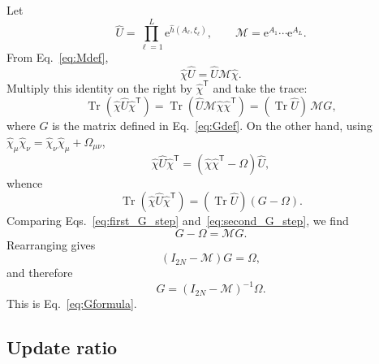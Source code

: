 \documentclass[twocolumn,aps,prb,10pt,amsmath,amssymb,amsthm,superscriptaddress]{revtex4-2}
\newcommand{\Tr}{\operatorname{Tr}}
\newcommand{\ee}{\mathrm{e}}
\newcommand{\trans}{\mathsf{T}}
\newcommand{\mc}[1]{\mathcal{#1}}
\theoremstyle{remark}
\begin{document}
Let
\begin{equation}
    \hat U = \prod_{\ell=1}^{L}\ee^{\hat h(A_\ell,\xi_\ell)},
    \qquad
    \mc M = \ee^{A_1}\cdots\ee^{A_L}.
\end{equation}
From Eq.~\eqref{eq:Mdef},
\begin{equation}
    \hat\chi\hat U = \hat U\mc M\hat\chi.
    \label{eq:chiUappendix}
\end{equation}
Multiply this identity on the right by $\hat\chi^\trans$ and take the trace:
\begin{equation}
    \Tr\left(\hat\chi\hat U\hat\chi^\trans\right)
    = \Tr\left(\hat U\mc M\hat\chi\hat\chi^\trans\right)
    = (\Tr\hat U)\,\mc M G,
    \label{eq:first_G_step}
\end{equation}
where $G$ is the matrix defined in Eq.~\eqref{eq:Gdef}. On the other hand, using $\hat\chi_\mu\hat\chi_\nu = \hat\chi_\nu\hat\chi_\mu + \Omega_{\mu\nu}$,
\begin{equation}
    \hat\chi\hat U\hat\chi^\trans = (\hat\chi\hat\chi^\trans-\Omega)\hat U,
\end{equation}
whence
\begin{equation}
    \Tr\left(\hat\chi\hat U\hat\chi^\trans\right)
    = (\Tr\hat U)(G-\Omega).
    \label{eq:second_G_step}
\end{equation}
Comparing Eqs.~\eqref{eq:first_G_step} and~\eqref{eq:second_G_step}, we find
\begin{equation}
    G-\Omega = \mc M G.
\end{equation}
Rearranging gives
\begin{equation}
    (I_{2N}-\mc M)G = \Omega,
\end{equation}
and therefore
\begin{equation}
    G = (I_{2N}-\mc M)^{-1}\Omega.
\end{equation}
This is Eq.~\eqref{eq:Gformula}.

\subsection{Update ratio}
\label{app:update}
\end{document}
